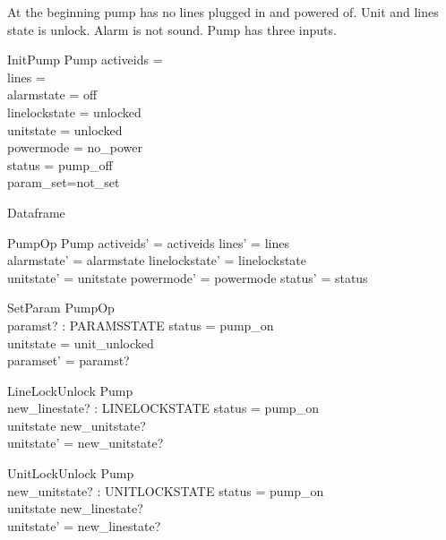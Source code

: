 \documentclass{article}
\begin{document}
	At the beginning pump has no lines plugged in and powered of.
	Unit and lines state is unlock. Alarm is not sound. 
	Pump has three inputs.	
	
	\begin{schema}{InitPump}
		Pump
		\where
		activeids = \emptyset \\
		lines = \emptyset \\
		alarmstate = off \\
		linelockstate = unlocked \\
		unitstate  = unlocked \\
		powermode =  no\_power \\
		status = pump\_off\\
		param\_set=not\_set	
	\end{schema}
	
	Dataframe
	\begin{schema}{PumpOp}
		\Delta Pump
	\where
    	activeids' = activeids \land
    	lines' = lines \land \\
    	alarmstate' = alarmstate \land 
    	linelockstate' = linelockstate \land \\
    	unitstate' = unitstate \land
    	powermode' = powermode \land
    	status' = status \\
    \end{schema}
	
	\begin{schema}{SetParam}
		PumpOp \\
		paramst? : PARAMSSTATE 
	\where
		status = pump\_on \\ 
		unitstate = unit\_unlocked \\
		paramset' = paramst?
	\end{schema}

    \begin{schema}{LineLockUnlock}
		\Delta Pump \\
		new\_linestate? : LINELOCKSTATE
	\where
		status = pump\_on \\ 
		unitstate \neq new\_unitstate? \\
		unitstate' = new\_unitstate? \\		
	\end{schema}
	
    \begin{schema}{UnitLockUnlock}
		\Delta Pump \\
		new\_unitstate? : UNITLOCKSTATE
	\where
		status = pump\_on \\ 
		unitstate \neq new\_linestate? \\
		unitstate' = new\_linestate? \\
	\end{schema} 	
	
\end{document}
